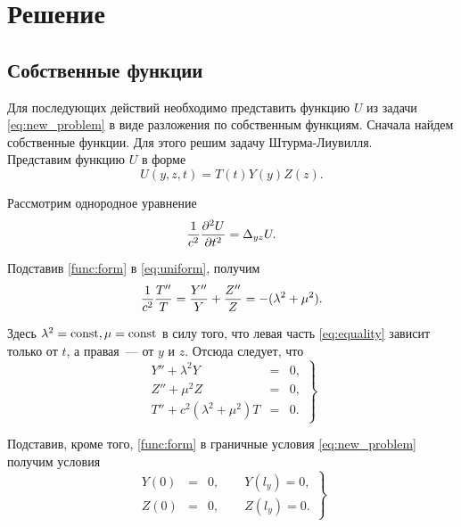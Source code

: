 \chapter{Решение}
\section{Собственные функции}
Для последующих действий необходимо представить функцию $U$ из задачи \eqref{eq:new_problem} в виде разложения по собственным функциям. Сначала найдем собственные функции. Для этого решим задачу Штурма-Лиувилля.\\
Представим функцию $U$ в форме  
\begin{equation}
  \label{func:form}
  U(y, z, t) = T(t)Y(y)Z(z).
\end{equation}

Рассмотрим однородное уравнение
\begin{equation}
  \label{eq:uniform}
  \frac{1}{c^2} \frac{\partial^2 U}{\partial t^2} = \Delta_{yz} U.\\
\end{equation}

Подставив \eqref{func:form} в \eqref{eq:uniform}, получим
\begin{equation}
  \label{eq:equality}
  \frac{1}{c^2}\frac{T''}{T} = \frac{Y''}{Y} + \frac{Z''}{Z} = -(\lambda^2 + \mu^2).\\
\end{equation}

Здесь $\lambda^2 = \mathrm{const}, \mu = \mathrm{const}$ в силу того, что левая часть \eqref{eq:equality} зависит только от $t$,
а правая~--- от $y$ и $z$. Отсюда следует, что
\begin{equation}
  \label{eq:shturm-liuville}
  \left.
  \begin{array}{rcl}
    Y'' + \lambda^2 Y &=& 0,\\
    Z'' + \mu^2 Z &=& 0,\\
    T'' + c^2(\lambda^2 + \mu^2)T &=& 0.
  \end{array}
  \right\}
\end{equation}

Подставив, кроме того, \eqref{func:form} в граничные условия \eqref{eq:new_problem} получим условия
\begin{equation}
  \left.
  \label{eq:conditions}
  \begin{array}{rcl}
    Y(0) &=& 0,\qquad Y(l_y) = 0,\\
    Z(0) &=& 0,\qquad Z(l_y) = 0.
  \end{array}
  \right\}
\end{equation}

